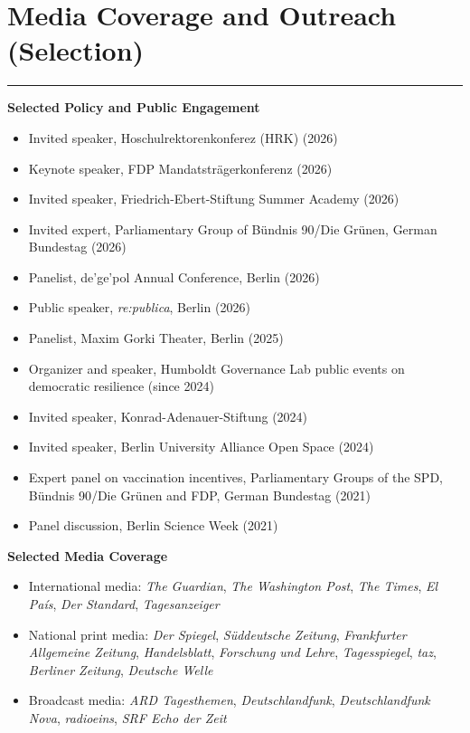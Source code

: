\section*{Media Coverage and Outreach (Selection)}
\vspace{-2em}\rule{\textwidth}{0.5pt}\vspace{1em}

\textbf{Selected Policy and Public Engagement}
\begin{itemize}[topsep=0pt, noitemsep, leftmargin=3]
    \item Invited speaker, Hoschulrektorenkonferez (HRK) (2026)
    \item Keynote speaker, FDP Mandatsträgerkonferenz (2026)
    \item Invited speaker, Friedrich-Ebert-Stiftung Summer Academy (2026)
    \item Invited expert, Parliamentary Group of Bündnis 90/Die Grünen, German Bundestag (2026)
    \item Panelist, de'ge'pol Annual Conference, Berlin (2026)
    \item Public speaker, \textit{re:publica}, Berlin (2026)
    \item Panelist, Maxim Gorki Theater, Berlin (2025)
    \item Organizer and speaker, Humboldt Governance Lab public events on democratic resilience (since 2024)
    \item Invited speaker, Konrad-Adenauer-Stiftung (2024)
    \item Invited speaker, Berlin University Alliance Open Space (2024)
    \item Expert panel on vaccination incentives, Parliamentary Groups of the SPD, Bündnis 90/Die Grünen and FDP, German Bundestag (2021)
    \item Panel discussion, Berlin Science Week (2021)
\end{itemize}

\vspace{0.8em}

\textbf{Selected Media Coverage}
\begin{itemize}[topsep=0pt, noitemsep, leftmargin=3]
    \item International media: \textit{The Guardian}, \textit{The Washington Post}, \textit{The Times}, \textit{El País}, \textit{Der Standard}, \textit{Tagesanzeiger} 
    \item National print media: \textit{Der Spiegel}, \textit{Süddeutsche Zeitung}, \textit{Frankfurter Allgemeine Zeitung}, \textit{Handelsblatt}, \textit{Forschung und Lehre}, \textit{Tagesspiegel}, \textit{taz}, \textit{Berliner Zeitung}, \textit{Deutsche Welle}
    \item Broadcast media: \textit{ARD Tagesthemen}, \textit{Deutschlandfunk}, \textit{Deutschlandfunk Nova}, \textit{radioeins}, \textit{SRF Echo der Zeit}
\end{itemize}

